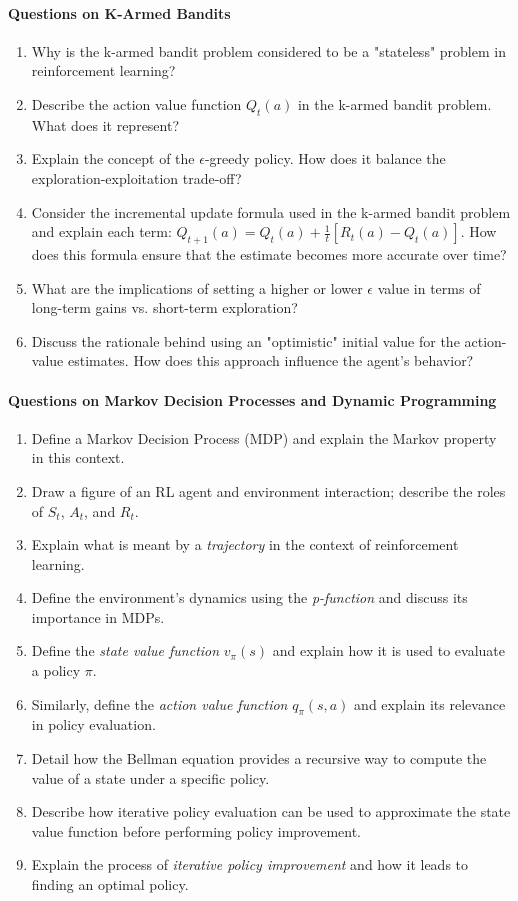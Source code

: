 \paragraph*{Questions on K-Armed Bandits}

\begin{enumerate}
\item Why is the k-armed bandit problem considered to be a "stateless" problem in reinforcement learning?
\item Describe the action value function $Q_t(a)$ in the k-armed bandit problem. What does it represent?
\item Explain the concept of the $\epsilon$-greedy policy. How does it balance the exploration-exploitation trade-off?
\item Consider the incremental update formula used in the k-armed bandit problem and explain each term:
$Q_{t+1}(a) = Q_t(a) + \frac{1}{t} [R_t(a)-Q_t(a)]$. How does this formula ensure that the estimate becomes more accurate over time?
\item What are the implications of setting a higher or lower $\epsilon$ value in terms of long-term gains vs. short-term exploration?
\item Discuss the rationale behind using an "optimistic" initial value for the action-value estimates. How does this approach influence the agent's behavior?
\end{enumerate}

\paragraph*{Questions on Markov Decision Processes and Dynamic Programming}

\begin{enumerate}
\item Define a Markov Decision Process (MDP) and explain the Markov property in this context.
\item Draw a figure of an RL agent and environment interaction; describe the roles of $S_t$, $A_t$, and $R_t$.
\item Explain what is meant by a \emph{trajectory} in the context of reinforcement learning.
\item Define the environment's dynamics using the \emph{p-function} and discuss its importance in MDPs.
\item Define the \emph{state value function} $v_\pi(s)$ and explain how it is used to evaluate a policy $\pi$.
\item Similarly, define the \emph{action value function} $q_\pi(s, a)$ and explain its relevance in policy evaluation.
\item Detail how the Bellman equation provides a recursive way to compute the value of a state under a specific policy.
\item Describe how iterative policy evaluation can be used to approximate the state value function before performing policy improvement.
\item Explain the process of \emph{iterative policy improvement} and how it leads to finding an optimal policy.
\end{enumerate}


